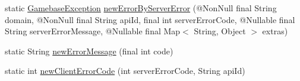 \begin{DoxyCompactItemize}
\item 
static \hyperlink{classcom_1_1toast_1_1android_1_1gamebase_1_1base_1_1_gamebase_exception}{Gamebase\+Exception} \hyperlink{classcom_1_1toast_1_1android_1_1gamebase_1_1base_1_1_gamebase_error_af6a27716a44f247527608e14098bb01b}{new\+Error\+By\+Server\+Error} (@Non\+Null final String domain, @Non\+Null final String api\+Id, final int server\+Error\+Code, @Nullable final String server\+Error\+Message, @Nullable final Map$<$ String, Object $>$ extras)
\item 
static String \hyperlink{classcom_1_1toast_1_1android_1_1gamebase_1_1base_1_1_gamebase_error_a42ebfd14c26b172ab5e528b94647e9e2}{new\+Error\+Message} (final int code)
\item 
static int \hyperlink{classcom_1_1toast_1_1android_1_1gamebase_1_1base_1_1_gamebase_error_ae1e31671405d6d3c4660aacf9d9dd3c5}{new\+Client\+Error\+Code} (int server\+Error\+Code, String api\+Id)
\end{DoxyCompactItemize}
